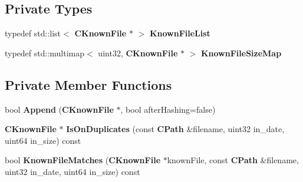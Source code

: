 \subsection*{Private Types}
\begin{DoxyCompactItemize}
\item 
typedef std::list$<$ {\bf CKnownFile} $\ast$ $>$ {\bfseries KnownFileList}\label{classCKnownFileList_a4cb07b5d2f0df325d2d117ed1b5fe55e}

\item 
typedef std::multimap$<$ uint32, {\bf CKnownFile} $\ast$ $>$ {\bfseries KnownFileSizeMap}\label{classCKnownFileList_aa92427032a4d1398146b1369036d2e99}

\end{DoxyCompactItemize}
\subsection*{Private Member Functions}
\begin{DoxyCompactItemize}
\item 
bool {\bfseries Append} ({\bf CKnownFile} $\ast$, bool afterHashing=false)\label{classCKnownFileList_ad6149d257521c9d2c07a13d9d06bc2a1}

\item 
{\bf CKnownFile} $\ast$ {\bfseries IsOnDuplicates} (const {\bf CPath} \&filename, uint32 in\_\-date, uint64 in\_\-size) const \label{classCKnownFileList_a854bab40da2114c3abee453c4a921d62}

\item 
bool {\bfseries KnownFileMatches} ({\bf CKnownFile} $\ast$knownFile, const {\bf CPath} \&filename, uint32 in\_\-date, uint64 in\_\-size) const \label{classCKnownFileList_a097d682d1c4ac860b30ad873e438faef}

\end{DoxyCompactItemize}
